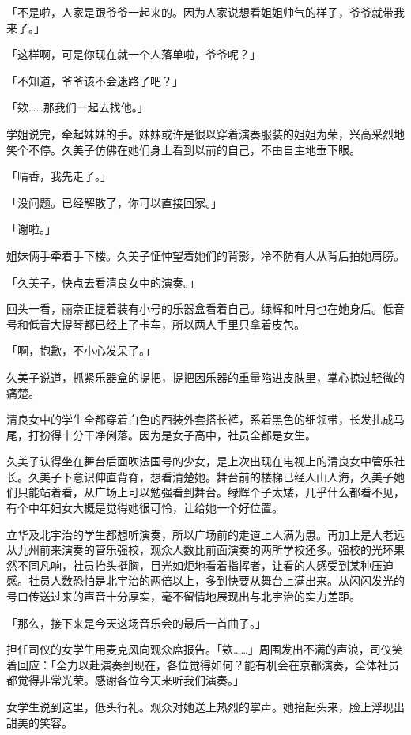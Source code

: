 \documentclass[UTF8]{ctexart}
\begin{document}
    「不是啦，人家是跟爷爷一起来的。因为人家说想看姐姐帅气的样子，爷爷就带我来了。」 

    「这样啊，可是你现在就一个人落单啦，爷爷呢？」 

    「不知道，爷爷该不会迷路了吧？」 

    「欸……那我们一起去找他。」 

    学姐说完，牵起妹妹的手。妹妹或许是很以穿着演奏服装的姐姐为荣，兴高采烈地笑个不停。久美子仿佛在她们身上看到以前的自己，不由自主地垂下眼。 

    「晴香，我先走了。」 

    「没问题。已经解散了，你可以直接回家。」 

    「谢啦。」 

    姐妹俩手牵着手下楼。久美子怔忡望着她们的背影，冷不防有人从背后拍她肩膀。 

    「久美子，快点去看清良女中的演奏。」 

    回头一看，丽奈正提着装有小号的乐器盒看着自己。绿辉和叶月也在她身后。低音号和低音大提琴都已经上了卡车，所以两人手里只拿着皮包。 

    「啊，抱歉，不小心发呆了。」 

    久美子说道，抓紧乐器盒的提把，提把因乐器的重量陷进皮肤里，掌心掠过轻微的痛楚。 

    清良女中的学生全都穿着白色的西装外套搭长裤，系着黑色的细领带，长发扎成马尾，打扮得十分干净俐落。因为是女子高中，社员全都是女生。 

    久美子认得坐在舞台后面吹法国号的少女，是上次出现在电视上的清良女中管乐社长。久美子下意识伸直背脊，想看清楚她。舞台前的楼梯已经人山人海，久美子她们只能站着看，从广场上可以勉强看到舞台。绿辉个子太矮，几乎什么都看不见，有个中年妇女大概是觉得她很可怜，让给她一个好位置。 

    立华及北宇治的学生都想听演奏，所以广场前的走道上人满为患。再加上是大老远从九州前来演奏的管乐强校，观众人数比前面演奏的两所学校还多。强校的光环果然不同凡响，社员抬头挺胸，目光如炬地看着指挥者，让看的人感受到某种压迫感。社员人数恐怕是北宇治的两倍以上，多到快要从舞台上满出来。从闪闪发光的号口传送过来的声音十分厚实，毫不留情地展现出与北宇治的实力差距。 

    「那么，接下来是今天这场音乐会的最后一首曲子。」 

    担任司仪的女学生用麦克风向观众席报告。「欸……」周围发出不满的声浪，司仪笑着回应：「全力以赴演奏到现在，各位觉得如何？能有机会在京都演奏，全体社员都觉得非常光荣。感谢各位今天来听我们演奏。」 

    女学生说到这里，低头行礼。观众对她送上热烈的掌声。她抬起头来，脸上浮现出甜美的笑容。 
\end{document}
